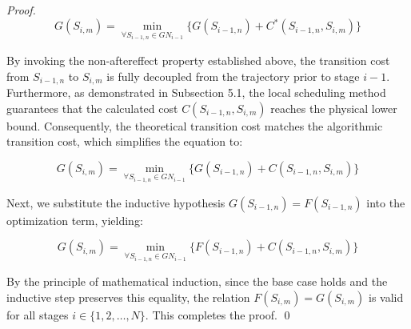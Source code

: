 \begin{proof}

$$G(S_{i,m}) = \min_{\forall S_{i-1,n} \in GN_{i-1}} { \{G(S_{i-1,n}) + C^*( S_{i-1,n} , S_{i,m} )\}}$$

By invoking the non-aftereffect property established above, the transition cost from $S_{i-1,n}$ to $S_{i,m}$ is fully decoupled from the trajectory prior to stage $i-1$.
Furthermore, as demonstrated in Subsection 5.1, the local scheduling method guarantees that the calculated cost $C(S_{i-1,n}, S_{i,m})$ reaches the physical lower bound.
Consequently, the theoretical transition cost matches the algorithmic transition cost, which simplifies the equation to:


$$G(S_{i,m}) = \min_{\forall S_{i-1,n} \in GN_{i-1}} { \{G(S_{i-1,n}) +  C(S_{i-1,n} , S_{i,m})\} }$$


Next, we substitute the inductive hypothesis $G(S_{i-1,n}) = F(S_{i-1,n})$ into the optimization term, yielding:


$$G(S_{i,m}) = \min_{\forall S_{i-1,n} \in GN_{i-1}} { \{F(S_{i-1,n}) + C(S_{i-1,n}, S_{i,m})\} }$$


By the principle of mathematical induction, since the base case holds and the inductive step preserves this equality, the relation $F(S_{i,m}) = G(S_{i,m})$ is valid for all stages $i \in \{1, 2, \dots, N\}$.
This completes the proof.
\qed
\end{proof}

 
